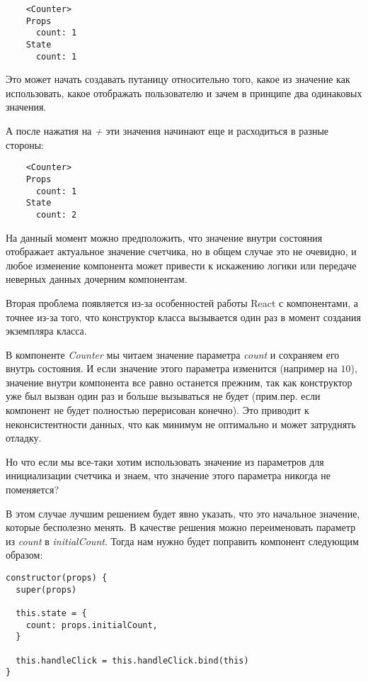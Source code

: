 \begin{lstlisting}
    <Counter>
    Props
      count: 1
    State
      count: 1
\end{lstlisting}

Это может начать создавать путаницу относительно того, какое из значение как использовать, какое отображать пользователю и зачем в принципе два одинаковых значения.

А после нажатия на \textit{+} эти значения начинают еще и расходиться в разные стороны:

\begin{lstlisting}
    <Counter>
    Props
      count: 1
    State
      count: 2
\end{lstlisting}

На данный момент можно предположить, что значение внутри состояния отображает актуальное значение счетчика, но в общем случае это не очевидно, и любое изменение компонента может привести к искажению логики или передаче неверных данных дочерним компонентам.

Вторая проблема появляется из-за особенностей работы React с компонентами, а точнее из-за того, что конструктор класса вызывается один раз в момент создания экземпляра класса.

В компоненте \textit{Counter} мы читаем значение параметра \textit{count} и сохраняем его внутрь состояния. И если значение этого параметра изменится (например на $10$), значение внутри компонента все равно останется прежним, так как конструктор уже был вызван один раз и больше вызываться не будет (прим.пер. если компонент не будет полностью перерисован конечно). Это приводит к неконсистентности данных, что как минимум не оптимально и может затруднять отладку.

Но что если мы все-таки хотим использовать значение из параметров для инициализации счетчика и знаем, что значение этого параметра никогда не поменяется?

В этом случае лучшим решением будет явно указать, что это начальное значение, которые бесполезно менять. В качестве решения можно переименовать параметр из \textit{count} в \textit{initialCount}. Тогда нам нужно будет поправить компонент следующим образом:

\begin{lstlisting}
constructor(props) {
  super(props)
  
  this.state = {
    count: props.initialCount,
  }
  
  this.handleClick = this.handleClick.bind(this)
}
\end{lstlisting}

